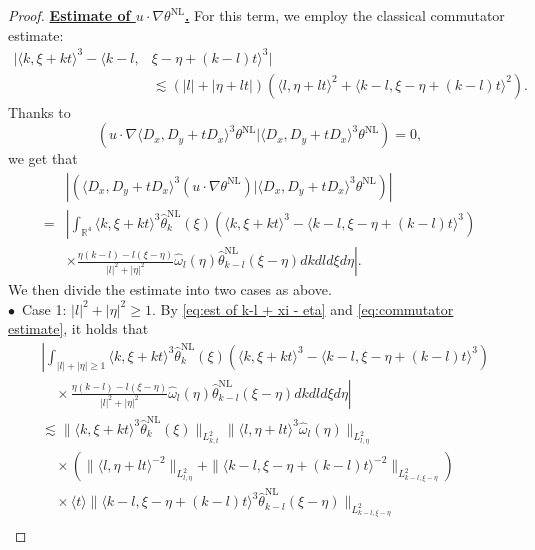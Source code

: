 \documentclass[reqno, 12pt]{amsart} %
\theoremstyle{plain} %
\theoremstyle{definition}
\theoremstyle{remark}
\numberwithin{equation}{section} %
\newcommand{\no}{\nonumber}
\newcommand{\lt}{\left}
\newcommand{\rt}{\right}
\begin{document}
\begin{proof}
		\underline{\bf Estimate of $u \cdot \nabla \theta^{\mathrm{NL}}$.} For this term, we employ the classical commutator estimate:
		\begin{align} \label{eq:commutator estimate}
			|\langle k, \xi+k t\rangle^3-\langle k-l, &\xi-\eta+(k-l) t\rangle^3| \no \\
			&\lesssim(|l|+|\eta+l t|)\left(\langle l, \eta+l t\rangle^2+\langle k-l, \xi-\eta+(k-l) t\rangle^2\right).
		\end{align}
		Thanks to
		$$
		\left(u \cdot \nabla\langle D_x, D_y+t D_x\rangle^3 \theta^{\mathrm{NL}}  \big| \langle D_x, D_y+t D_x\rangle^3 \theta^{\mathrm{NL}}\right)=0,
		$$
		we get that
		$$
		\begin{aligned}
			& \left|\left(\langle D_x, D_y+t D_x\rangle^3(u \cdot \nabla \theta^{\mathrm{NL}}) \big| \langle D_x, D_y+t D_x\rangle^3 \theta^{\mathrm{NL}}\right)\right| \\
			= & \lt| \int_{\mathbb{R}^4}\langle k, \xi+k t\rangle^3 \hat{\theta}_k^{\mathrm{NL}}(\xi)\left(\langle k, \xi+k t\rangle^3-\langle k-l, \xi-\eta+(k-l) t\rangle^3\right) \rt. \\
			& \left.\times \frac{\eta(k-l)-l(\xi-\eta)}{|l|^2+|\eta|^2} \hat{\omega}_l(\eta) \hat{\theta}_{k-l}^{\mathrm{NL}}(\xi-\eta) d k d l d \xi d \eta \right| .
		\end{aligned}
		$$
		We then divide the estimate into two cases as above.\\
		$\bullet$~Case 1: $|l|^2+|\eta|^2 \geq 1$.
		By \eqref{eq:est of k-l + xi - eta} and \eqref{eq:commutator estimate}, it holds that
		\begin{equation}
			\begin{aligned} \label{eq:temp.2}
				& \lt|\int_{|l|+|\eta| \geq 1}\langle k, \xi+k t\rangle^3 \hat{\theta}_k^{\mathrm{NL}}(\xi)\left(\langle k, \xi+k t\rangle^3-\langle k-l, \xi-\eta+(k-l) t\rangle^3\right) \rt. \\
				& \left.\quad \times \frac{\eta(k-l)-l(\xi-\eta)}{|l|^2+|\eta|^2} \hat{\omega}_l(\eta) \hat{\theta}_{k-l}^{\mathrm{NL}}(\xi-\eta) d k d l d \xi d \eta \right| \\
				& \lesssim\|\langle k, \xi+k t\rangle^3 \hat{\theta}_k^{\mathrm{NL}}(\xi)\|_{L_{k, t}^2}\|\langle l, \eta+l t\rangle^{3} \hat{\omega}_l(\eta)\|_{L_{l, \eta}^2} \\
				& \quad \times\left(\|\langle l, \eta+l t\rangle^{-2}\|_{L_{l, \eta}^2}+\|\langle k-l, \xi-\eta+(k-l) t\rangle^{-2}\|_{L_{k-l, \xi-\eta}^2}\right) \\
				& \quad \times\langle t\rangle\|\langle k-l, \xi-\eta+(k-l) t\rangle^{3} \hat{\theta}_{k-l}^{\mathrm{NL}}(\xi-\eta)\|_{L_{k-l, \xi-\eta}^2} \\

\end{aligned}
\end{equation}
\end{proof}
\end{document}
